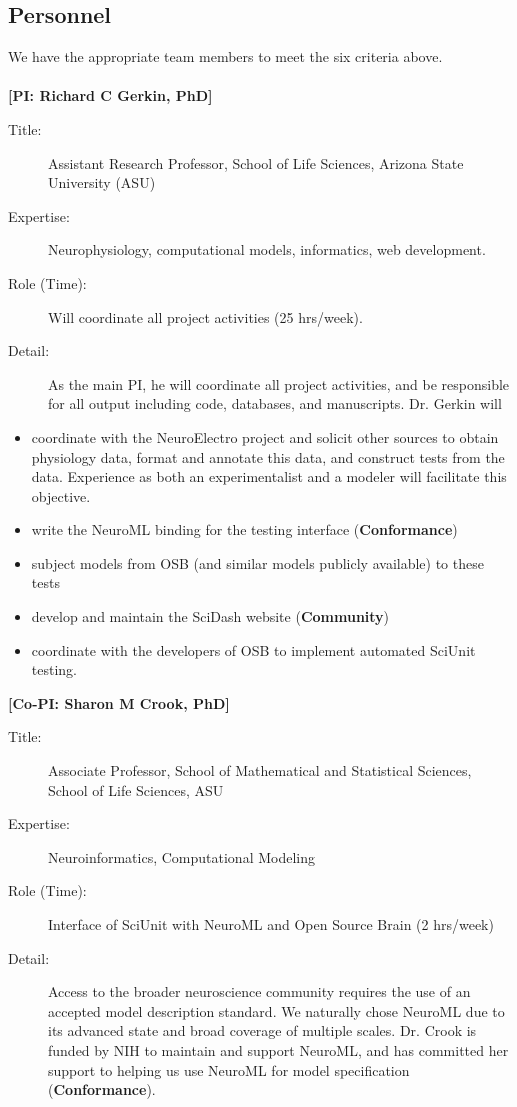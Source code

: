 \documentclass[11pt,letterpaper]{article}
\begin{document}
\subsection{Personnel}
We have the appropriate team members to meet the six criteria above. 
\\
\\
\textbf{[PI: Richard C Gerkin, PhD]}
\begin{description}
\item[Title:] Assistant Research Professor, School of Life Sciences, Arizona State University (ASU)
\item[Expertise:] Neurophysiology, computational models, informatics, web development.   
\item[Role (Time):] Will coordinate all project activities (25 hrs/week).  
\item[Detail:] As the main PI, he will coordinate all project activities, and be responsible for all output including code, databases, and manuscripts. Dr. Gerkin will
\end{description}
\begin{itemize}
\item coordinate with the NeuroElectro project and solicit other sources to obtain physiology data, format and annotate this data, and construct tests from the data.  Experience as both an experimentalist and a modeler will facilitate this objective.   
\item write the NeuroML binding for the testing interface (\textbf{Conformance})
\item subject models from OSB (and similar models publicly available) to these tests 
\item develop and maintain the SciDash website (\textbf{Community})
\item coordinate with the developers of OSB to implement automated SciUnit testing.
\end{itemize}
\textbf{[Co-PI: Sharon M Crook, PhD]}
\begin{description}
\item[Title:] Associate Professor, School of Mathematical and Statistical Sciences, School of Life Sciences, ASU
\item[Expertise:] Neuroinformatics, Computational Modeling
\item[Role (Time):] Interface of SciUnit with NeuroML and Open Source Brain (2 hrs/week)
\item[Detail:] Access to the broader neuroscience community requires the use of an accepted model description standard.  We naturally chose NeuroML due to its advanced state and broad coverage of multiple scales.  Dr. Crook is funded by NIH to maintain and support NeuroML, and has committed her support to helping us use NeuroML for model specification (\textbf{Conformance}).  
\end{description}
\end{document}
